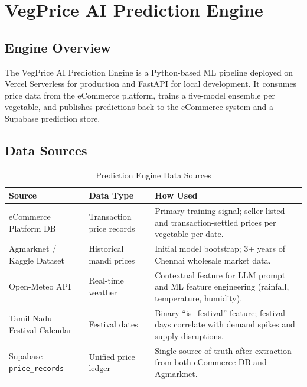 \documentclass[12pt, a4paper, oneside]{report}
\begin{document}
\chapter{VegPrice AI Prediction Engine}

\section{Engine Overview}

The VegPrice AI Prediction Engine is a Python-based ML pipeline deployed on
Vercel Serverless for production and FastAPI for local development. It
consumes price data from the eCommerce platform, trains a five-model ensemble
per vegetable, and publishes predictions back to the eCommerce system and a
Supabase prediction store.

\section{Data Sources}

\begin{table}[H]
\centering
\caption{Prediction Engine Data Sources}
\label{tab:data-sources}
\begin{tabularx}{\textwidth}{@{} L{3.8cm} L{3.0cm} X @{}}
\toprule
\textbf{Source} & \textbf{Data Type} & \textbf{How Used} \\
\midrule
eCommerce Platform DB
  & Transaction price records & Primary training signal; seller-listed
    and transaction-settled prices per vegetable per date. \\[4pt]
Agmarknet / Kaggle Dataset
  & Historical mandi prices   & Initial model bootstrap; 3+ years of
    Chennai wholesale market data. \\[4pt]
Open-Meteo API
  & Real-time weather          & Contextual feature for LLM prompt and
    ML feature engineering (rainfall, temperature, humidity). \\[4pt]
Tamil Nadu Festival Calendar
  & Festival dates             & Binary ``is\_festival'' feature; festival
    days correlate with demand spikes and supply disruptions. \\[4pt]
Supabase \texttt{price\_records}
  & Unified price ledger       & Single source of truth after extraction
    from both eCommerce DB and Agmarknet. \\
\bottomrule
\end{tabularx}
\end{table}
\end{document}
